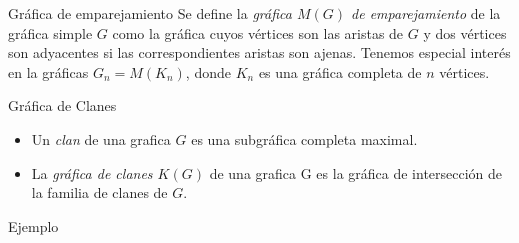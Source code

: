 \documentclass[final,xcolor=svgnames]{beamer}
\begin{document}
\begin{frame}{}
\begin{columns}
\begin{column}{0.5\textwidth}
      \begin{block}{Gráfica de emparejamiento}
        Se define la \emph{gráfica $M(G)$ de emparejamiento} de la gráfica
        simple $G$ como la gráfica cuyos vértices son las aristas de
        $G$ y dos vértices son adyacentes si las correspondientes
        aristas son ajenas. Tenemos especial interés en la gráficas
        $G_{n}=M(K_{n})$, donde $K_{n}$ es una gráfica completa de $n$ vértices.
      \end{block}


      \begin{block}{Gráfica de Clanes}
        \begin{itemize}
        \item Un \textit{clan} de una grafica $G$ es una subgráfica completa maximal. 
        \item La \textit{gráfica de clanes $K(G)$} de una grafica G es la gráfica de intersección de
          la familia de clanes de $G$.   
        \end{itemize}

      \end{block}
      
      \begin{block}{Ejemplo}
        \begin{minipage}{0.3\linewidth} 
          \centering
          

\end{minipage}
\end{block}
\end{column}
\end{columns}
\end{frame}
\end{document}
